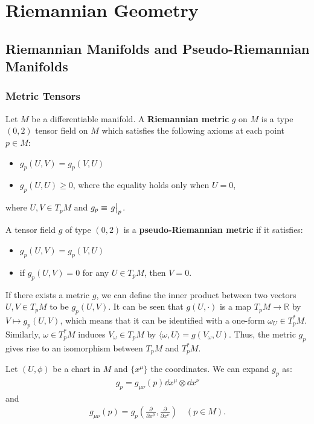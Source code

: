 \documentclass[10pt]{article}
\begin{document}
\clearpage
\section{Riemannian Geometry}
\subsection{Riemannian Manifolds and Pseudo-Riemannian Manifolds}
\subsubsection{Metric Tensors}

\begin{definition}
    Let $M$ be a differentiable manifold.
    A \textbf{Riemannian metric} $g$ on $M$ is a type $(0, 2)$ tensor field on $M$ which satisfies the following axioms at each point $p \in M$:
    \begin{itemize}
        \item $g_p(U,V)=g_p(V,U)$
        \item $g_p(U,U)\ge0$, where the equality holds only when $U=0$,
    \end{itemize}
    where $U,V\in T_p M$ and $g_p\equiv\eval{g}_p$.
\end{definition}

A tensor field $g$ of type $(0, 2)$ is a \textbf{pseudo-Riemannian metric} if it satisfies:
\begin{itemize}
    \item $g_p(U,V)=g_p(V,U)$
    \item if $g_p(U,V)=0$ for any $U\in T_p M$, then $V=0$.
\end{itemize}

If there exists a metric $g$, we can define the inner product between two vectors $U, V\in T_pM$ to be $g_p(U,V)$.
It can be seen that $g(U,\cdot)$ is a map $T_pM\to \mathbb{R}$ by $V\mapsto g_p(U,V)$, which means that it can be identified with a one-form $\omega_U\in T_p^* M$.
Similarly, $\omega\in T^*_p M$ induces $V_\omega\in T_pM$ by $\langle \omega,U\rangle=g(V_\omega,U)$.
Thus, the metric $g_p$ gives rise to an isomorphism between $T_pM$ and $T^*_pM$.

Let $(U,\phi)$ be a chart in $M$ and $\{x^\mu\}$ the coordinates.
We can expand $g_p$ as:
\begin{align}
    g_p=g_{\mu\nu}(p)\dd x^\mu\otimes\dd x^\nu
\end{align}
and
\begin{align}
    g_{\mu\nu}(p)=g_p\left(\frac{\partial}{\partial x^\mu},\frac{\partial}{\partial x^\nu}\right) \quad (p\in M).
\end{align}
\end{document}
